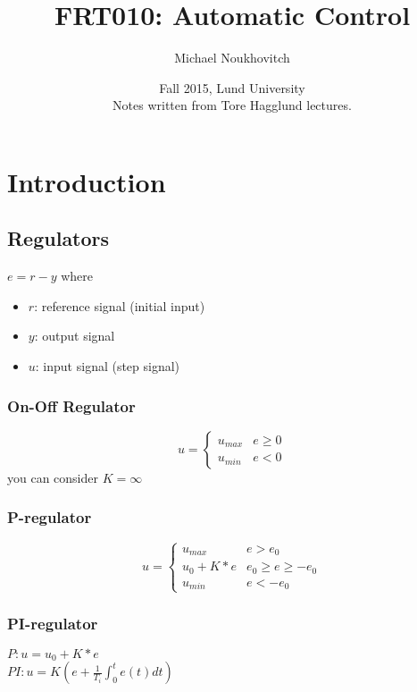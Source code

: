 \documentclass[]{article}
\theoremstyle{definition}
\begin{document}
	\let\ref\Cref

	\title{\bf{FRT010: Automatic Control}}
	\date{Fall 2015, Lund University\\ \center Notes written from Tore Hagglund lectures.}
	\author{Michael Noukhovitch}

	\maketitle
	\newpage
	\tableofcontents
	\newpage

	\section{Introduction}
	\subsection{Regulators}
	$e = r - y$ where
	\begin{itemize}
		\item $r$: reference signal (initial input)
		\item $y$: output signal
		\item $u$: input signal (step signal)
	\end{itemize}

	\subsubsection{On-Off Regulator}
	\[ 
		u = 
		\begin{cases}
			u_{max} & e \ge 0 \\
			u_{min} & e < 0
		\end{cases}
	\]
	you can consider $K = \infty$


	\subsubsection{P-regulator}
	\[ 
		u = 
		\begin{cases}
			u_{max} & e > e_0 \\
			u_0 + K*e & e_0 \ge e \ge -e_0 \\
			u_{min} & e < -e_0
		\end{cases}
	\]

	\subsubsection{PI-regulator}
	$P: u = u_0 + K*e $ \\
	$PI: u = K(e + \frac{1}{T_i} \int_{0}^{t} e(t)dt) $
\end{document}
